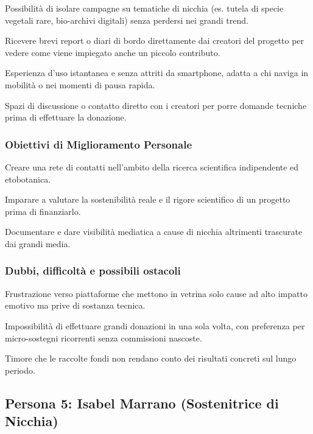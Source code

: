 \documentclass[11pt,a4paper]{article}
\begin{document}
Possibilità di isolare campagne su tematiche di nicchia (es. tutela di specie vegetali rare, bio-archivi digitali) senza perdersi nei grandi trend.

Ricevere brevi report o diari di bordo direttamente dai creatori del progetto per vedere come viene impiegato anche un piccolo contributo.

Esperienza d'uso istantanea e senza attriti da smartphone, adatta a chi naviga in mobilità o nei momenti di pausa rapida.

Spazi di discussione o contatto diretto con i creatori per porre domande tecniche prima di effettuare la donazione.

\subsubsection{Obiettivi di Miglioramento Personale}

Creare una rete di contatti nell'ambito della ricerca scientifica indipendente ed etobotanica.

Imparare a valutare la sostenibilità reale e il rigore scientifico di un progetto prima di finanziarlo.

Documentare e dare visibilità mediatica a cause di nicchia altrimenti trascurate dai grandi media.

\subsubsection{Dubbi, difficoltà e possibili ostacoli}

Frustrazione verso piattaforme che mettono in vetrina solo cause ad alto impatto emotivo ma prive di sostanza tecnica.

Impossibilità di effettuare grandi donazioni in una sola volta, con preferenza per micro-sostegni ricorrenti senza commissioni nascoste.

Timore che le raccolte fondi non rendano conto dei risultati concreti sul lungo periodo.


\subsection{Persona 5: Isabel Marrano (Sostenitrice di Nicchia)}
\label{subsec:persona5}
\end{document}
